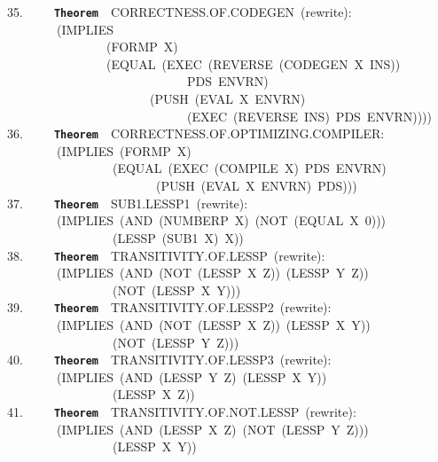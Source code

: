 \documentclass[11pt]{book}
\newenvironment{pubasis}{\begin{flushleft}\ttfamily\small}{\normalsize\rmfamily\end{flushleft}}
\newcommand{\axiomordefinition}[1]{\vspace{6pt}\texttt{\textbf{#1}}}
\begin{document}
\begin{pubasis}
35.~~~~~\axiomordefinition{Theorem}~~CORRECT\-NESS.OF.CODEGEN~(rewrite):\\
~~~~~~~~(IMPLIES\\
~~~~~~~~~~~~~~~~(FORMP~X)\\
~~~~~~~~~~~~~~~~(EQUAL~(EXEC~(REVERSE~(CODEGEN~X~INS))\\
~~~~~~~~~~~~~~~~~~~~~~~~~~~~~PDS~ENVRN)\\
~~~~~~~~~~~~~~~~~~~~~~~(PUSH~(EVAL~X~ENVRN)\\
~~~~~~~~~~~~~~~~~~~~~~~~~~~~~(EXEC~(REVERSE~INS)~PDS~ENVRN))))\\

36.~~~~~\axiomordefinition{Theorem}~~CORRECT\-NESS.OF.OPTIMIZING.COMPILER:\\
~~~~~~~~(IMPLIES~(FORMP~X)\\
~~~~~~~~~~~~~~~~~(EQUAL~(EXEC~(COMPILE~X)~PDS~ENVRN)\\
~~~~~~~~~~~~~~~~~~~~~~~~(PUSH~(EVAL~X~ENVRN)~PDS)))\\

37.~~~~~\axiomordefinition{Theorem}~~SUB1.LESSP1~(rewrite):\\
~~~~~~~~(IMPLIES~(AND~(NUMBERP~X)~(NOT~(EQUAL~X~0)))\\
~~~~~~~~~~~~~~~~~(LESSP~(SUB1~X)~X))\\

38.~~~~~\axiomordefinition{Theorem}~~TRANSITIVITY.OF.LESSP~(rewrite):\\
~~~~~~~~(IMPLIES~(AND~(NOT~(LESSP~X~Z))~(LESSP~Y~Z))\\
~~~~~~~~~~~~~~~~~(NOT~(LESSP~X~Y)))\\

39.~~~~~\axiomordefinition{Theorem}~~TRANSITIVITY.OF.LESSP2~(rewrite):\\
~~~~~~~~(IMPLIES~(AND~(NOT~(LESSP~X~Z))~(LESSP~X~Y))\\
~~~~~~~~~~~~~~~~~(NOT~(LESSP~Y~Z)))\\

40.~~~~~\axiomordefinition{Theorem}~~TRANSITIVITY.OF.LESSP3~(rewrite):\\
~~~~~~~~(IMPLIES~(AND~(LESSP~Y~Z)~(LESSP~X~Y))\\
~~~~~~~~~~~~~~~~~(LESSP~X~Z))\\

41.~~~~~\axiomordefinition{Theorem}~~TRANSITIVITY.OF.NOT.LESSP~(rewrite):\\
~~~~~~~~(IMPLIES~(AND~(LESSP~X~Z)~(NOT~(LESSP~Y~Z)))\\
~~~~~~~~~~~~~~~~~(LESSP~X~Y))\\


\end{pubasis}
\end{document}
